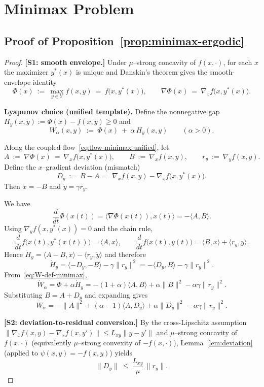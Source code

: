 \documentclass{article}
\newcommand{\1}{\mathbf{1}}
\begin{document}
\section{Minimax Problem}
\subsection{Proof of Proposition~\ref{prop:minimax-ergodic}}\label{subsec:proof-minmax}

\begin{proof}
\textbf{[S1: smooth envelope.]}
Under $\mu$--strong concavity of $f(x,\cdot)$, for each $x$ the maximizer $y^*(x)$ is unique and
Danskin's theorem gives the smooth-envelope identity
\[
\Phi(x)\ :=\ \max_{y\in Y} f(x,y)\ =\ f\bigl(x,y^*(x)\bigr),
\qquad
\nabla\Phi(x)\ =\ \nabla_x f\bigl(x,y^*(x)\bigr).
\]

\textbf{Lyapunov choice (unified template).}
Define the nonnegative gap $H_y(x,y):=\Phi(x)-f(x,y)\ge 0$ and
\begin{equation}\label{eq:W-def-minimax}
W_\alpha(x,y)\ :=\ \Phi(x)\ +\ \alpha\,H_y(x,y)\qquad(\alpha>0).
\end{equation}

Along the coupled flow~\eqref{eq:flow-minimax-unified}, let
\[
A\ :=\ \nabla\Phi(x)\ =\ \nabla_x f\bigl(x,y^*(x)\bigr),\qquad
B\ :=\ \nabla_x f(x,y),\qquad
r_y\ :=\ \nabla_y f(x,y).
\]
Define the $x$--gradient deviation (mismatch)
\[
D_y\ :=\ B-A\ =\ \nabla_x f(x,y)-\nabla_x f\bigl(x,y^*(x)\bigr).
\]
Then $\dot x=-B$ and $\dot y=\gamma r_y$.

We have
\[
\frac{d}{dt}\Phi(x(t))=\langle \nabla\Phi(x(t)),\dot x(t)\rangle
=-\langle A,B\rangle.
\]
Using $\nabla_y f(x,y^*(x))=0$ and the chain rule,
\[
\frac{d}{dt}f\bigl(x(t),y^*(x(t))\bigr)=\langle A,\dot x\rangle,
\qquad
\frac{d}{dt}f\bigl(x(t),y(t)\bigr)=\langle B,\dot x\rangle+\langle r_y,\dot y\rangle.
\]
Hence $\dot H_y=\langle A-B,\dot x\rangle-\langle r_y,\dot y\rangle$ and therefore
\[
\dot H_y
=\langle -D_y,-B\rangle-\gamma\|r_y\|^2
=-\langle D_y,B\rangle-\gamma\|r_y\|^2.
\]
From~\eqref{eq:W-def-minimax},
\[
\dot W_\alpha=\dot\Phi+\alpha\dot H_y
=-(1+\alpha)\langle A,B\rangle+\alpha\|B\|^2-\alpha\gamma\|r_y\|^2.
\]
Substituting $B=A+D_y$ and expanding gives
\begin{equation}\label{eq:W-expand-minimax}
\dot W_\alpha
=-\|A\|^2+(\alpha-1)\langle A,D_y\rangle+\alpha\|D_y\|^2-\alpha\gamma\|r_y\|^2.
\end{equation}

\textbf{[S2: deviation-to-residual conversion.]}
By the cross-Lipschitz assumption $\|\nabla_x f(x,y)-\nabla_x f(x,y')\|\le L_{xy}\|y-y'\|$ and
$\mu$--strong concavity of $f(x,\cdot)$ (equivalently $\mu$--strong convexity of $-f(x,\cdot)$),
Lemma~\ref{lem:deviation} (applied to $\psi(x,y)=-f(x,y)$) yields
\begin{equation}\label{eq:Dy-ry-minimax}
\|D_y\|\ \le\ \frac{L_{xy}}{\mu}\,\|r_y\|.
\end{equation}


\end{proof}
\end{document}
